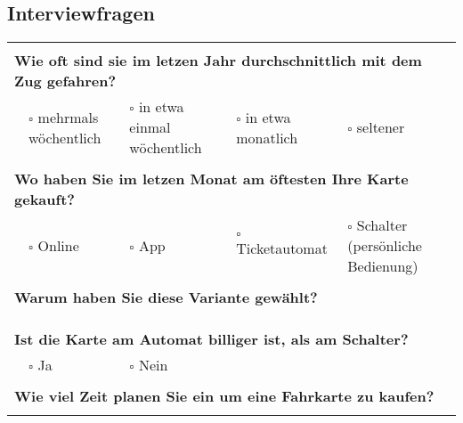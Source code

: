 \documentclass[]{article}
\begin{document}
\newpage
{}
\begin{landscape}

\section{Interviewfragen}
\label{sec:interviewfragen}

\begin{table}[h!]
	\large
	\begin{tabular}{|llllll|}
		\hline
		& & & & & \\
		\multicolumn{6}{|l|}{\textbf{Wie oft sind sie im letzen Jahr durchschnittlich mit dem Zug gefahren?}}                               \\ \hline
		& $\square$ mehrmals wöchentlich & $\square$ in etwa einmal wöchentlich & $\square$ in etwa monatlich & $\square$ seltener &        \\ \hline
		& & & & & \\
		\multicolumn{6}{|l|}{\textbf{Wo haben Sie im letzen Monat am öftesten Ihre Karte gekauft?}}                                         \\ \hline
		& $\square$ Online & $\square$ App & $\square$ Ticketautomat & \multicolumn{2}{l|}{$\square$ Schalter (persönliche Bedienung)}      \\ \hline
		& & & & & \\
		\multicolumn{6}{|l|}{\textbf{Warum haben Sie diese Variante gewählt?}}                                                              \\ \hline
		\multicolumn{6}{|l|}{}                                                                                                              \\
		& & & & & \\ \hline
		& & & & & \\
		\multicolumn{6}{|l|}{\textbf{Ist die Karte am Automat billiger ist, als am Schalter?}}                                              \\ \hline
		& $\square$ Ja & $\square$ Nein &  &  &                                                                                             \\ \hline
		& & & & & \\
		\multicolumn{6}{|l|}{\textbf{Wie viel Zeit planen Sie ein um eine Fahrkarte zu kaufen?}}                                            \\ \hline
		\multicolumn{6}{|l|}{}                                                                                                              \\

\end{tabular}
\end{table}
\end{landscape}
\end{document}
